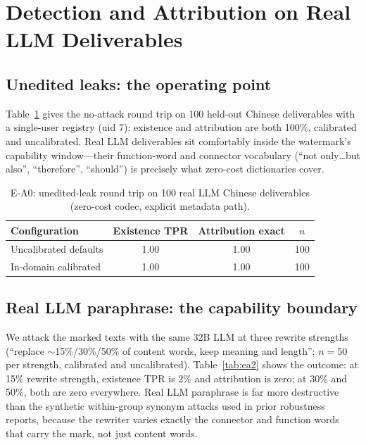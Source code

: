\section{Detection and Attribution on Real LLM Deliverables}
\label{sec:robustness}

\subsection{Unedited leaks: the operating point}
Table~\ref{tab:ea0} gives the no-attack round trip on 100 held-out Chinese
deliverables with a single-user registry (uid 7): existence and attribution
are both 100\%, calibrated and uncalibrated. Real LLM deliverables sit
comfortably inside the watermark's capability window---their function-word
and connector vocabulary (``not only\ldots but also'', ``therefore'',
``should'') is precisely what zero-cost dictionaries cover.

\begin{table}[t]
\centering\small
\caption{E-A0: unedited-leak round trip on 100 real LLM Chinese
deliverables (zero-cost codec, explicit metadata path).}
\label{tab:ea0}
\begin{tabular}{@{}lccc@{}}
\toprule
Configuration & Existence TPR & Attribution exact & $n$ \\
\midrule
Uncalibrated defaults & 1.00 & 1.00 & 100 \\
In-domain calibrated & 1.00 & 1.00 & 100 \\
\bottomrule
\end{tabular}
\end{table}

\subsection{Real LLM paraphrase: the capability boundary}
We attack the marked texts with the same 32B LLM at three rewrite strengths
(``replace $\sim$15\%/30\%/50\% of content words, keep meaning and
length''; $n{=}50$ per strength, calibrated and uncalibrated).
Table~\ref{tab:ea2} shows the outcome: at 15\% rewrite strength, existence
TPR is 2\% and attribution is zero; at 30\% and 50\%, both are zero
everywhere. Real LLM paraphrase is far more destructive than the synthetic
within-group synonym attacks used in prior robustness reports, because the
rewriter varies exactly the connector and function words that carry the
mark, not just content words.

